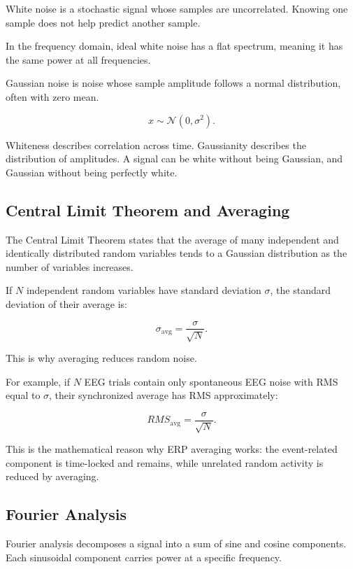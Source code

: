 White noise is a stochastic signal whose samples are uncorrelated. Knowing one sample does not help predict another sample.

In the frequency domain, ideal white noise has a flat spectrum, meaning it has the same power at all frequencies.

Gaussian noise is noise whose sample amplitude follows a normal distribution, often with zero mean.

\[
x \sim \mathcal{N}(0,\sigma^2).
\]

\begin{authornote}
Whiteness describes correlation across time. Gaussianity describes the distribution of amplitudes. A signal can be white without being Gaussian, and Gaussian without being perfectly white.
\end{authornote}

\subsection{Central Limit Theorem and Averaging}

The Central Limit Theorem states that the average of many independent and identically distributed random variables tends to a Gaussian distribution as the number of variables increases.

If $N$ independent random variables have standard deviation $\sigma$, the standard deviation of their average is:

\[
\sigma_{\text{avg}}
=
\frac{\sigma}{\sqrt{N}}.
\]

This is why averaging reduces random noise.

For example, if $N$ EEG trials contain only spontaneous EEG noise with RMS equal to $\sigma$, their synchronized average has RMS approximately:

\[
RMS_{\text{avg}}
=
\frac{\sigma}{\sqrt{N}}.
\]

\begin{authornote}
This is the mathematical reason why ERP averaging works: the event-related component is time-locked and remains, while unrelated random activity is reduced by averaging.
\end{authornote}

\subsection{Fourier Analysis}

Fourier analysis decomposes a signal into a sum of sine and cosine components. Each sinusoidal component carries power at a specific frequency.

